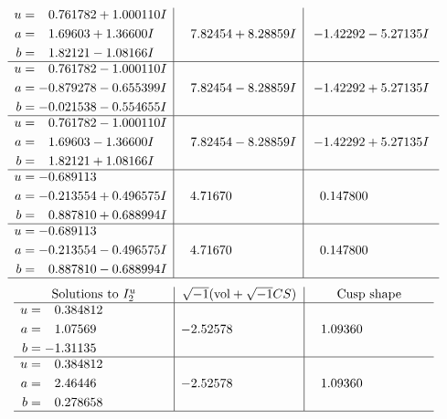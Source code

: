 \documentclass[1p]{elsarticle_modified}
\theoremstyle{definition}
\newcommand{\I}{\sqrt{-1}}
\begin{document}
$$\begin{array}{c|c|c}
\begin{aligned}
u &= \phantom{-}0.761782 + 1.000110 I \\
a &= \phantom{-}1.69603 + 1.36600 I \\
b &= \phantom{-}1.82121 - 1.08166 I\end{aligned}
 & \phantom{-}7.82454 + 8.28859 I & -1.42292 - 5.27135 I \\ \hline\begin{aligned}
u &= \phantom{-}0.761782 - 1.000110 I \\
a &= -0.879278 - 0.655399 I \\
b &= -0.021538 - 0.554655 I\end{aligned}
 & \phantom{-}7.82454 - 8.28859 I & -1.42292 + 5.27135 I \\ \hline\begin{aligned}
u &= \phantom{-}0.761782 - 1.000110 I \\
a &= \phantom{-}1.69603 - 1.36600 I \\
b &= \phantom{-}1.82121 + 1.08166 I\end{aligned}
 & \phantom{-}7.82454 - 8.28859 I & -1.42292 + 5.27135 I \\ \hline\begin{aligned}
u &= -0.689113\phantom{ +0.000000I} \\
a &= -0.213554 + 0.496575 I \\
b &= \phantom{-}0.887810 + 0.688994 I\end{aligned}
 & \phantom{-}4.71670\phantom{ +0.000000I} & \phantom{-}0.147800\phantom{ +0.000000I} \\ \hline\begin{aligned}
u &= -0.689113\phantom{ +0.000000I} \\
a &= -0.213554 - 0.496575 I \\
b &= \phantom{-}0.887810 - 0.688994 I\end{aligned}
 & \phantom{-}4.71670\phantom{ +0.000000I} & \phantom{-}0.147800\phantom{ +0.000000I}\\
 \hline 
 \end{array}$$\newpage$$\begin{array}{c|c|c}  
\text{Solutions to }I^u_{2}& \I (\text{vol} + \sqrt{-1}CS) & \text{Cusp shape}\\
 \hline 
\begin{aligned}
u &= \phantom{-}0.384812\phantom{ +0.000000I} \\
a &= \phantom{-}1.07569\phantom{ +0.000000I} \\
b &= -1.31135\phantom{ +0.000000I}\end{aligned}
 & -2.52578\phantom{ +0.000000I} & \phantom{-}1.09360\phantom{ +0.000000I} \\ \hline\begin{aligned}
u &= \phantom{-}0.384812\phantom{ +0.000000I} \\
a &= \phantom{-}2.46446\phantom{ +0.000000I} \\
b &= \phantom{-}0.278658\phantom{ +0.000000I}\end{aligned}
 & -2.52578\phantom{ +0.000000I} & \phantom{-}1.09360\phantom{ +0.000000I}\\
 \hline 
 \end{array}$$\newpage\newpage\renewcommand{\arraystretch}{1}
\end{document}
